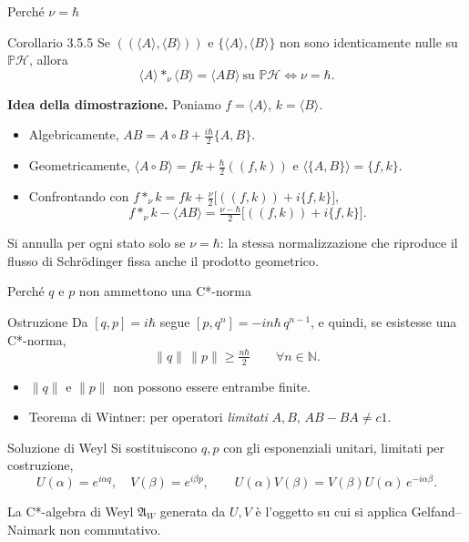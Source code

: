 \documentclass[aspectratio=169,11pt]{beamer}
\begin{document}
\begin{frame}{Perché $\nu=\hbar$}
	\begin{block}{Corollario 3.5.5}
		Se $(\!(\langle A\rangle,\langle B\rangle)\!)$ e $\{\langle A\rangle,\langle B\rangle\}$ non sono identicamente nulle su $\mathbb{P} \mathcal{H}$, allora
		\[
		\langle A\rangle *_\nu \langle B\rangle = \langle AB\rangle \ \text{su } \mathbb{P} \mathcal{H} \iff \nu = \hbar.
		\]
	\end{block}
	\textbf{Idea della dimostrazione.} Poniamo $f=\langle A\rangle$, $k=\langle B\rangle$.
	\begin{itemize}
		\item Algebricamente, $AB = A\circ B + \tfrac{i\hbar}{2}\{A,B\}$.
		\item Geometricamente, $\langle A\circ B\rangle = fk + \tfrac{\hbar}{2}(\!(f,k)\!)$ e $\langle\{A,B\}\rangle = \{f,k\}$.
		\item Confrontando con $f*_\nu k = fk + \tfrac{\nu}{2}\big[(\!(f,k)\!)+i\{f,k\}\big]$,
		\[
		f *_\nu k - \langle AB\rangle = \tfrac{\nu-\hbar}{2}\big[(\!(f,k)\!) + i\{f,k\}\big].
		\]
	\end{itemize}
	Si annulla per ogni stato solo se $\nu=\hbar$: la stessa normalizzazione che riproduce il flusso di Schrödinger fissa anche il prodotto geometrico.
\end{frame}


\begin{frame}{Perché $q$ e $p$ non ammettono una C*-norma}
	\begin{block}{Ostruzione}
		Da $[q,p]=i\hbar$ segue $[p,q^n] = -in\hbar\, q^{n-1}$, e quindi, se esistesse una C*-norma,
		\[
		\|q\|\,\|p\| \ge \tfrac{n\hbar}{2} \qquad \forall n\in\mathbb N.
		\]
	\end{block}
	\begin{itemize}
		\item $\|q\|$ e $\|p\|$ non possono essere entrambe finite.
		\item Teorema di Wintner: per operatori \emph{limitati} $A,B$, $AB-BA \ne c 1$.
	\end{itemize}
	\begin{block}{Soluzione di Weyl}
		Si sostituiscono $q,p$ con gli esponenziali unitari, limitati per costruzione,
		\[
		U(\alpha)=e^{i\alpha q}, \quad V(\beta) = e^{i\beta p}, \qquad U(\alpha)V(\beta) = V(\beta)U(\alpha)\,e^{-i\alpha\beta}.
		\]
	\end{block}
	La C*-algebra di Weyl $\mathfrak{A}_W$ generata da $U,V$ è l'oggetto su cui si applica Gelfand--Naimark non commutativo.
\end{frame}
\end{document}

